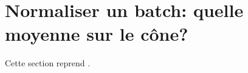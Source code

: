 %
%
%
%


\section{Normaliser un batch: quelle moyenne sur le cône?}
\label{sec:spdnet-batchnorm}

\begin{contributions}
  Cette section reprend .
\end{contributions}

